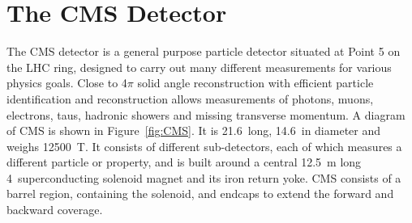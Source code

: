 
%                       

\section{The CMS Detector}
\label{sec:CMS}

The \ac{CMS} detector is a general purpose particle detector situated at Point 5 on the \ac{LHC} ring, designed to carry out many different measurements for various physics goals.
Close to 4$\pi$ solid angle reconstruction with 
efficient particle identification and reconstruction allows measurements of photons, muons, electrons, taus, hadronic showers and missing transverse momentum.
%
A diagram of \ac{CMS} is shown in Figure~\ref{fig:CMS}. It is 21.6~\m long, 14.6~\m in diameter and weighs 12500~T. 
It consists of different sub-detectors, each of which measures a different particle or property, 
and is built around a central 12.5~m long 4~\T superconducting solenoid magnet and its iron return yoke.
%
\ac{CMS} consists of a barrel region, containing the solenoid, and endcaps to extend the forward and backward coverage.


